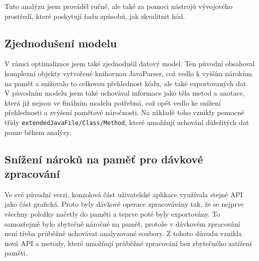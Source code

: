 		Tuto analýzu jsem prováděl ručně, ale také za pomoci nástrojů vývojového prostředí, které poskytují řadu způsobů, jak zkvalitnit kód. 
  	
	\subsection{Zjednodušení modelu} 
		V rámci optimalizace jsem také zjednodušil datový model. Ten původní obsahoval komplexní objekty vytvořené knihovnou JavaParser, což vedlo k vyšším nárokům na paměť a snižovalo to celkovou přehlednost kódu, ale také exportovaných dat. V původním modelu jsem také uchovával informace jako těla metod a anotace, která již nejsou ve finálním modelu potřebná, což opět vedlo ke snížení přehlednosti a zvýšení paměťové náročnosti. Na základě toho vznikly pomocné třídy \texttt{extendedJavaFile/Class/Method}, které umožňují uchování důležitých dat pouze během analýzy.
 
	\subsection{Snížení nároků na paměť pro dávkové zpracování}
		Ve své původní verzi, konzolová část uživatelské aplikace využívala stejné API jako část grafická. Proto byly dávkové operace zpracovávány tak, že se nejprve všechny položky načetly do paměti a teprve poté byly exportovány. To samozřejmě bylo zbytečně náročné na paměť, protože v dávkovém zpracování není třeba průběžně uchovávat analyzované soubory. Z tohoto důvodu vznikla nová API a metody, které umožňují průběžné zpracování bez zbytečného zatížení paměti.
